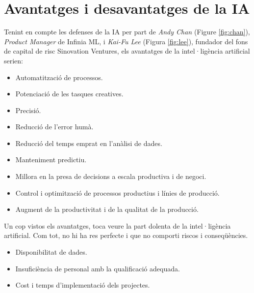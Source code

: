 \documentclass[a4paper,12pt]{report}
\begin{document}
\section*{Avantatges i desavantatges de la IA}
Tenint en compte les defenses de la IA per part de \textit{Andy Chan} (Figure \ref{fig:chan}), \textit{Product Manager} de Infinia ML, i \textit{Kai-Fu Lee} (Figura \ref{fig:lee}), fundador del fons de capital de risc Sinovation Ventures, els avantatges de la intel·ligència artificial serien:
\begin{itemize}
    \item Automatització de processos.
    \item Potenciació de les tasques creatives.
    \item Precisió.
    \item Reducció de l'error humà.
    \item Reducció del temps emprat en l'anàlisi de dades.
    \item Manteniment predictiu.
    \item Millora en la presa de decisions a escala productiva i de negoci.
    \item Control i optimització de processos productius i línies de producció.
    \item Augment de la productivitat i de la qualitat de la producció.
\end{itemize}
Un cop vistos els avantatges, toca veure la part dolenta de la intel·ligència artificial. Com tot, no hi ha res perfecte i que no comporti riscos i conseqüències.
\begin{itemize}
    \item Disponibilitat de dades.
    \item Insuficiència de personal amb la qualificació adequada.
    \item Cost i temps d'implementació dels projectes.
\end{itemize}
\end{document}
